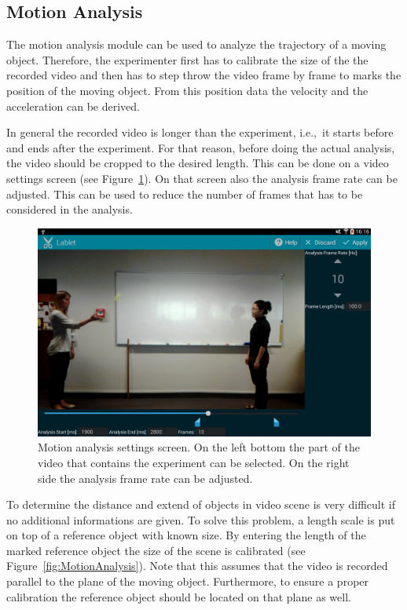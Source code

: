 \documentclass{sigchi}
\newcommand{\ie}{i.e.,\ }
\begin{document}
\subsection{Motion Analysis}
The motion analysis module can be used to analyze the trajectory of a
moving object.  Therefore, the experimenter first has to calibrate the
size of the the recorded video and then has to step throw the video
frame by frame to marks the position of the moving object.  From this
position data the velocity and the acceleration can be derived.

In general the recorded video is longer than the experiment, \ie it
starts before and ends after the experiment.  For that reason, before
doing the actual analysis, the video should be cropped to the desired
length.  This can be done on a video settings screen (see
Figure~\ref{fig:MotionAnalysisSettingsScreen}).  On that screen also
the analysis frame rate can be adjusted.  This can be used to reduce
the number of frames that has to be considered in the analysis.

\begin{figure}
  \centering
  \includegraphics[width=.99\columnwidth]{MotionAnalysisSettings}
  \caption{Motion analysis settings screen.  On the left bottom the
    part of the video that contains the experiment can be selected.
    On the right side the analysis frame rate can be
    adjusted.\label{fig:MotionAnalysisSettingsScreen} }
\end{figure}

To determine the distance and extend of objects in video scene is very
difficult if no additional informations are given.  To solve this
problem, a length scale is put on top of a reference object with known
size.  By entering the length of the marked reference object the size
of the scene is calibrated (see Figure~\ref{fig:MotionAnalysis}).
Note that this assumes that the video is recorded parallel to the
plane of the moving object.  Furthermore, to ensure a proper
calibration the reference object should be located on that plane as
well.
\end{document}
